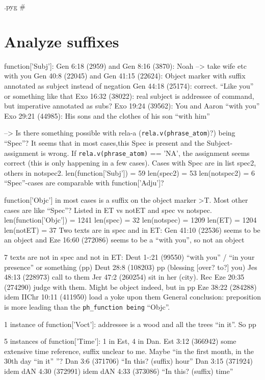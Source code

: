 \documentclass{report}
\makeatletter
\newcommand{\mi}[1]{\lstinline{#1}}
\newenvironment{python}{%
  \VerbatimEnvironment
  \minted@resetoptions
  \setkeys{minted@opt}{}
      \begin{VerbatimOut}{\jobname.pyg}}
{%
      \end{VerbatimOut}
      \minted@pygmentize{python}
      \DeleteFile{\jobname.pyg}}
\makeatother
\begin{document}
\begin{python}
{{{#}}}
\end{python}

\section{Analyze suffixes}
function['Subj']:
Gen 6:18 (2959) and Gen 8:16 (3870): Noah --> take wife etc with you
Gen 40:8 (22045) and Gen 41:15 (22624): Object marker with suffix annotated as subject instead of negation
Gen 44:18 (25174): correct. ``Like you'' or something like that
Exo 16:32 (38022): real subject is addressee of command, but imperative annotated as subs?
Exo 19:24 (39562): You and Aaron ``with you''
Exo 29:21 (44985): His sons and the clothes of his son ``with him''

--> Is there something possible with rela-a (\mi{rela.v(phrase_atom})?) being ``Spec''?
It seems that in most cases,this Spec is present and the Subject-assignment is wrong. If \mi{rela.v(phrase_atom)} == 'NA', the assignment seems correct (this is only happening in a few cases). Cases with Spec are in list spec2, others in notspec2.
len(function['Subj']) = 59
len(spec2) = 53
len(notspec2) = 6
``Spec''-cases are comparable with function['Adju']?

function['Objc'] in most cases is a suffix on the object marker >T.
Most other cases are like ``Spec''? Listed in ET vs notET and spec vs notspec.
len(function['Objc']) =  1241
len(spec) = 32
len(notspec) = 1209
len(ET) = 1204
len(notET) = 37
Two texts are in spec and in ET: Gen 41:10 (22536) seems to be an object and Eze 16:60 (272086) seems to be a ``with you'', so not an object

7 texts are not in spec and not in ET:
    Deut 1-:21 (99550) ``with you'' / ``in your presence'' or something (pp)
    Deut 28:8 (108203) pp (blessing [over? to?] you)
    Jes 48:13 (228973) call to them
    Jer 47:2 (260254) sit in her (city). Rec
    Eze 20:35 (274290) judge with them. Might be object indeed, but in pp
    Eze 38:22 (284288) idem
    IIChr 10:11 (411950) load a yoke upon them
General conclusion: preposition is more leading than the \mi{ph_function being} ``Objc''.

1 instance of function['Voct']: addressee is a wood and all the trees ``in it''. So pp

5 instances of function['Time']: 1 in Est, 4 in Dan.
    Est 3:12 (366942) some extensive time reference, suffix unclear to me. Maybe ``in the first month, in the 30th day ``in it'' ''?
    Dan 3:6 (371706) ``In this? (suffix) hour''
    Dan 3:15 (371924) idem
    dAN 4:30 (372991) idem
    dAN 4:33 (373086) ``In this? (suffix) time''
\end{document}
